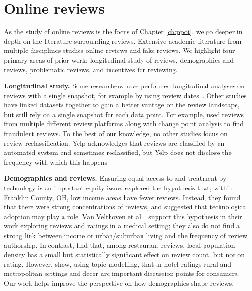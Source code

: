 \section{Online reviews} \label{sec:rim:related_work}

As the study of online reviews is the focus of Chapter \ref{ch:ppot}, we go deeper in depth on the literature surrounding reviews. Extensive academic literature from multiple disciplines studies online reviews and fake reviews. We highlight four primary areas of prior work: longitudinal study of reviews, demographics and reviews, problematic reviews, and incentives for reviewing.

\textbf{Longitudinal study.} Some researchers have performed longitudinal analyses on reviews with a single snapshot, for example by using review dates~\cite{bakhshi2014demographics,ye2016temporal,wang2017temporal}.  Other studies have linked datasets together to gain a better vantage on the review landscape, but still rely on a single snapshot for each data point. For example, \citet{nilizadeh2019think} used reviews from multiple different review platforms along with change point analysis to find fraudulent reviews. To the best of our knowledge, no other studies focus on review reclassification. Yelp acknowledges that reviews are classified by an automated system and sometimes reclassified, but Yelp does not disclose the frequency with which this happens \cite{yelpwhyrec,yelpwhychange}.

\textbf{Demographics and reviews.} Ensuring equal access to and treatment by technology is an important equity issue. \citet{baginski2014exploring} explored the hypothesis that, within Franklin County, OH, low income areas have fewer reviews. Instead, they found that there were strong concentrations of reviews, and suggested that technological adoption may play a role. Van Velthoven et al.~\cite{van2018cross} support this hypothesis in their work exploring reviews and ratings in a medical setting; they also do not find a strong link between income or urban/suburban living and the frequency of review authorship. In contrast, \citet{bakhshi2014demographics} find that, among restaurant reviews, local population density has a small but statistically significant effect on review count, but not on rating.  However, \citet{sutherland2020topic} show, using topic modelling, that in hotel ratings rural and metropolitan settings and decor are important discussion points for consumers. Our work helps improve the perspective on how demographics shape reviews.


